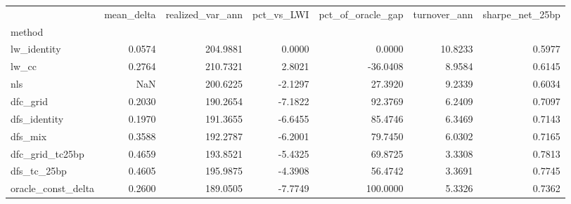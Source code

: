 \begin{tabular}{lrrrrrr}
\toprule
 & mean_delta & realized_var_ann & pct_vs_LWI & pct_of_oracle_gap & turnover_ann & sharpe_net_25bp \\
method &  &  &  &  &  &  \\
\midrule
lw_identity & 0.0574 & 204.9881 & 0.0000 & 0.0000 & 10.8233 & 0.5977 \\
lw_cc & 0.2764 & 210.7321 & 2.8021 & -36.0408 & 8.9584 & 0.6145 \\
nls & NaN & 200.6225 & -2.1297 & 27.3920 & 9.2339 & 0.6034 \\
dfc_grid & 0.2030 & 190.2654 & -7.1822 & 92.3769 & 6.2409 & 0.7097 \\
dfs_identity & 0.1970 & 191.3655 & -6.6455 & 85.4746 & 6.3469 & 0.7143 \\
dfs_mix & 0.3588 & 192.2787 & -6.2001 & 79.7450 & 6.0302 & 0.7165 \\
dfc_grid_tc25bp & 0.4659 & 193.8521 & -5.4325 & 69.8725 & 3.3308 & 0.7813 \\
dfs_tc_25bp & 0.4605 & 195.9875 & -4.3908 & 56.4742 & 3.3691 & 0.7745 \\
oracle_const_delta & 0.2600 & 189.0505 & -7.7749 & 100.0000 & 5.3326 & 0.7362 \\
\bottomrule
\end{tabular}
